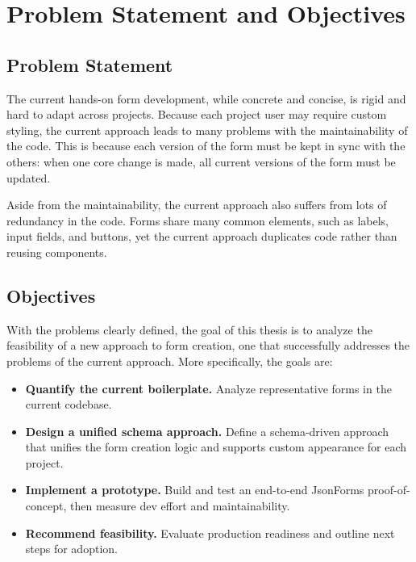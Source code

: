 \chapter{Problem Statement and Objectives}

\section{Problem Statement}
The current hands-on form development, while concrete and concise, is rigid and hard to adapt across projects.
Because each project user may require custom styling, the current approach leads to many problems with the maintainability
of the code.
This is because each version of the form must be kept in sync with the others: when one core change is made, all current
versions of the form must be updated.

Aside from the maintainability, the current approach also suffers from lots of redundancy in the code.
Forms share many common elements, such as labels, input fields, and buttons, yet the current approach duplicates code
rather than reusing components.

\section{Objectives}

With the problems clearly defined, the goal of this thesis is to analyze the feasibility of a new approach to form
creation, one that successfully addresses the problems of the current approach.
More specifically, the goals are:

\begin{itemize}
\item \textbf{Quantify the current boilerplate.} Analyze representative forms in the current codebase.
\item \textbf{Design a unified schema approach.} Define a schema-driven approach that unifies the form creation logic and
    supports custom appearance for each project.
\item \textbf{Implement a prototype.} Build and test an end-to-end JsonForms proof-of-concept, then measure dev effort and maintainability.
\item \textbf{Recommend feasibility.} Evaluate production readiness and outline next steps for adoption.
\end{itemize}